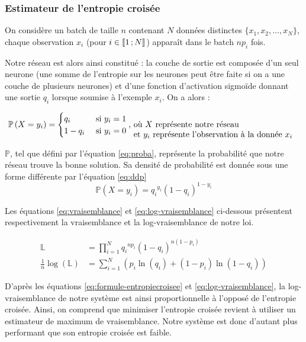 \subsubsection{Estimateur de l'entropie croisée}

On considère un batch de taille $n$ contenant $N$ données distinctes $\{x_1, x_2, \ldots, x_N\}$, chaque observation $x_i$ 
(pour $i \in \mathopen{\llbracket}1\,;N\mathclose{\rrbracket}$) apparaît dans le batch $np_i$ fois.

Notre réseau est alors ainsi constitué : la couche de sortie est composée d'un seul neurone (une somme de l'entropie sur les neurones peut être faite si 
on a une couche de plusieurs neurones) et d'une fonction d'activation sigmoïde donnant une sortie $q_i$ lorsque soumise à l'exemple $x_i$. On a alors :

\begin{equation}
 \mathbb{P}\left(X=y_i\right) = \begin{cases}q_i &\text{ si $y_i=1$}\\1-q_i &\text{ si $y_i=0$}\end{cases} \text{, \parbox[t]{20em}{où $X$ représente notre réseau\\
 et $y_i$ représente l'observation à la donnée $x_i$}}
 \label{eq:proba}
\end{equation}

$\mathbb{P}$, tel que défini par l'équation \ref{eq:proba}, représente la probabilité que notre réseau trouve la bonne solution. Sa densité de probabilité
est donnée sous une forme différente par l'équation \ref{eq:ddp}
\begin{equation}
 \label{eq:ddp}
 \mathbb{P}\left(X=y_i\right) = q_i{^{y_i}}\left(1-q_i\right)^{1-y_i}
\end{equation}

Les équations \ref{eq:vraisemblance} et \ref{eq:log-vraisemblance} ci-dessous présentent respectivement la vraisemblance et la log-vraisemblance de notre loi.

\begin{align}
 \mathbb{L} &= \prod_{i=1}^N q_i{^{np_i}}\left(1-q_i\right)^{n(1-p_i)}
 \label{eq:vraisemblance}\\
 \frac{1}{n}\log\left(\mathbb{L}\right) &= \sum_{i=1}^N \left(p_i\ln\left(q_i\right) + \left(1-p_i\right)\ln\left(1-q_i\right) \right)
 \label{eq:log-vraisemblance}
\end{align}

D'après les équations \ref{eq:formule-entropiecroisee} et \ref{eq:log-vraisemblance}, la log-vraisemblance de notre système est 
ainsi proportionnelle à l'opposé de l'entropie croisée. 
Ainsi, on comprend que minimiser l'entropie croisée revient à utiliser un estimateur de maximum de vraisemblance. 
Notre système est donc d'autant plus performant que son entropie croisée est faible.


